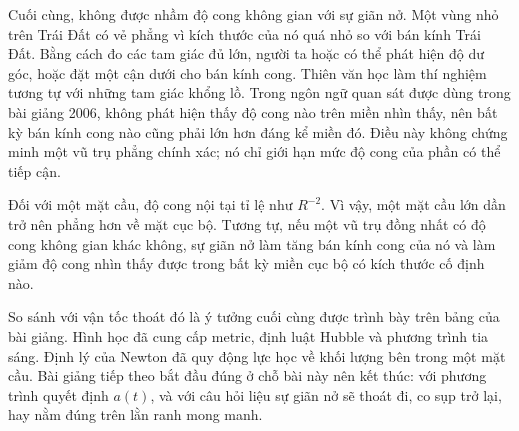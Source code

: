 \begin{classroomqa}
\end{classroomqa}

Cuối cùng, không được nhầm độ cong không gian với sự giãn nở. Một vùng nhỏ
trên Trái Đất có vẻ phẳng vì kích thước của nó quá nhỏ so với bán kính Trái
Đất. Bằng cách đo các tam giác đủ lớn, người ta hoặc có thể phát hiện độ dư
góc, hoặc đặt một cận dưới cho bán kính cong. Thiên văn học làm thí nghiệm
tương tự với những tam giác khổng lồ. Trong ngôn ngữ quan sát được dùng trong
bài giảng 2006, không phát hiện thấy độ cong nào trên miền nhìn thấy,
nên bất kỳ bán kính cong nào cũng phải lớn hơn đáng kể miền đó. Điều này
không chứng minh một vũ trụ phẳng chính xác; nó chỉ giới hạn mức độ cong của
phần có thể tiếp cận.

Đối với một mặt cầu, độ cong nội tại tỉ lệ như \(R^{-2}\). Vì vậy, một mặt cầu lớn dần
trở nên phẳng hơn về mặt cục bộ. Tương tự, nếu một vũ trụ đồng nhất có độ cong
không gian khác không, sự giãn nở làm tăng bán kính cong của nó và làm giảm độ
cong nhìn thấy được trong bất kỳ miền cục bộ có kích thước cố định nào.

\begin{classroomqa}
\end{classroomqa}

So sánh với vận tốc thoát đó là ý tưởng cuối cùng được trình bày trên bảng
của bài giảng. Hình học đã cung cấp metric, định luật Hubble và phương trình tia
sáng. Định lý của Newton đã quy động lực học về khối lượng bên trong một mặt
cầu. Bài giảng tiếp theo bắt đầu đúng ở chỗ bài này nên kết thúc: với phương
trình quyết định \(a(t)\), và với câu hỏi liệu sự giãn nở sẽ thoát đi, co
sụp trở lại, hay nằm đúng trên lằn ranh mong manh.
